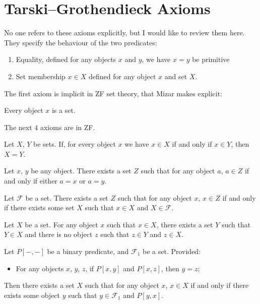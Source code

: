 \section*{Tarski--Grothendieck Axioms}

No one refers to these axioms explicitly, but I would like to review
them here. They specify the behaviour of the two predicates:
\begin{enumerate}
\item Equality, defined for any objects $x$ and $y$, we have $x=y$ be primitive
\item Set membership $x\in X$ defined for any object $x$ and set $X$.
\end{enumerate}
The first axiom is implicit in ZF set theory, that Mizar makes
explicit: 

\begin{axiom}
Every object $x$ is a set.
\end{axiom}

\noindent The next 4 axioms are in ZF.

\begin{axiom}[Extensionality]
Let $X$, $Y$ be sets.
If, for every object $x$ we have $x\in X$ if and only if $x\in Y$,
then $X=Y$.
\end{axiom}

\begin{axiom}[Pair]
Let $x$, $y$ be any object.
There exists a set $Z$ such that for any object $a$,
$a\in Z$ if and only if either $a=x$ or $a=y$.
\end{axiom}

\begin{axiom}[Union]
Let $\mathcal{F}$ be a set.
There exists a set $Z$ such that for any object $x$,
$x\in Z$ if and only if there exists some set $X$ such that $x\in X$ and $X\in\mathcal{F}$.
\end{axiom}


\begin{axiom}[Regularity]
Let $X$ be a set. For any object $x$ such that $x\in X$,
there exists a set $Y$ such that $Y\in X$ and there is no object $z$
such that $z\in Y$ and $z\in X$.
\end{axiom}

\begin{axiom}
Let $P[-,-]$ be a binary predicate, and $\mathcal{F}_{1}$ be a set.
Provided:
\begin{itemize}
\item For any objects $x$, $y$, $z$, if $P[x,y]$ and $P[x,z]$, then $y=z$;
\end{itemize}
Then there exists a set $X$ such that for any object $x$, $x\in X$ if
and only if there exists some object $y$ such that $y\in\mathcal{F}_{1}$
and $P[y,x]$.
\end{axiom}

